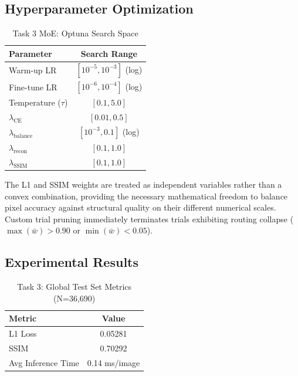\documentclass[conference]{IEEEtran}
\begin{document}
\subsection{Hyperparameter Optimization}

\begin{table}[H]
\centering
\caption{Task 3 MoE: Optuna Search Space}
\label{tab:task3_hpo}
\begin{tabular}{lc}
\toprule
\textbf{Parameter} & \textbf{Search Range} \\
\midrule
Warm-up LR & $[10^{-5}, 10^{-3}]$ (log) \\
Fine-tune LR & $[10^{-6}, 10^{-4}]$ (log) \\
Temperature ($\tau$) & $[0.1, 5.0]$ \\
$\lambda_{\text{CE}}$ & $[0.01, 0.5]$ \\
$\lambda_{\text{balance}}$ & $[10^{-3}, 0.1]$ (log) \\
$\lambda_{\text{recon}}$ & $[0.1, 1.0]$ \\
$\lambda_{\text{SSIM}}$ & $[0.1, 1.0]$ \\
\bottomrule
\end{tabular}
\end{table}

The L1 and SSIM weights are treated as independent variables rather than a convex combination, providing the necessary mathematical freedom to balance pixel accuracy against structural quality on their different numerical scales. Custom trial pruning immediately terminates trials exhibiting routing collapse ($\max(\bar{w}) > 0.90$ or $\min(\bar{w}) < 0.05$).

\subsection{Experimental Results}

\begin{table}[H]
\centering
\caption{Task 3: Global Test Set Metrics (N=36,690)}
\label{tab:task3_global}
\begin{tabular}{lc}
\toprule
\textbf{Metric} & \textbf{Value} \\
\midrule
L1 Loss & 0.05281 \\
SSIM & 0.70292 \\
Avg Inference Time & 0.14 ms/image \\
\bottomrule
\end{tabular}
\end{table}
\end{document}

